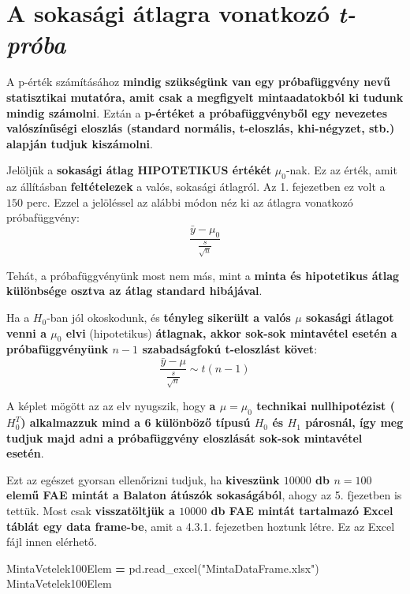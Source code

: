 \documentclass[
]{book}
\newenvironment{Shaded}{\begin{snugshade}}{\end{snugshade}}
\newcommand{\NormalTok}[1]{#1}
\newcommand{\OperatorTok}[1]{\textcolor[rgb]{0.81,0.36,0.00}{\textbf{#1}}}
\newcommand{\StringTok}[1]{\textcolor[rgb]{0.31,0.60,0.02}{#1}}
\begin{document}
\section{\texorpdfstring{A sokasági átlagra vonatkozó \emph{t-próba}}{A sokasági átlagra vonatkozó t-próba}}\label{a-sokasuxe1gi-uxe1tlagra-vonatkozuxf3-t-pruxf3ba}

A p-érték számításához \textbf{mindig szükségünk van egy próbafüggvény nevű statisztikai mutatóra, amit csak a megfigyelt mintaadatokból ki tudunk mindig számolni}. Eztán a \textbf{p-értéket a próbafüggvényből egy nevezetes valószínűségi eloszlás (standard normális, t-eloszlás, khi-négyzet, stb.) alapján tudjuk kiszámolni}.

Jelöljük a \textbf{sokasági átlag HIPOTETIKUS értékét} \(\mu_0\)-nak. Ez az érték, amit az állításban \textbf{feltételezek} a valós, sokasági átlagról. Az 1. fejezetben ez volt a \(150\) perc. Ezzel a jelöléssel az alábbi módon néz ki az átlagra vonatkozó próbafüggvény: \[\frac{\bar{y}-\mu_0}{\frac{s}{\sqrt{n}}}\]

Tehát, a próbafüggvényünk most nem más, mint a \textbf{minta és hipotetikus átlag különbsége osztva az átlag standard hibájával}.

Ha a \(H_0\)-ban jól okoskodunk, és \textbf{tényleg sikerült a valós \(\mu\) sokasági átlagot venni a \(\mu_0\) elvi} (hipotetikus) \textbf{átlagnak, akkor sok-sok mintavétel esetén a próbafüggvényünk \(n-1\) szabadságfokú t-eloszlást követ}: \[\frac{\bar{y}-\mu}{\frac{s}{\sqrt{n}}} \sim t(n-1)\]

A képlet mögött az az elv nyugszik, hogy \textbf{a \(\mu = \mu_0\) technikai nullhipotézist (\(H_0^T\)) alkalmazzuk mind a 6 különböző típusú \(H_0\) és \(H_1\) párosnál, így meg tudjuk majd adni a próbafüggvény eloszlását sok-sok mintavétel esetén}.

Ezt az egészet gyorsan ellenőrizni tudjuk, ha \textbf{kiveszünk \(10000\) db \(n=100\) elemű FAE mintát a Balaton átúszók sokaságából}, ahogy az 5. fjezetben is tettük.
Most csak \textbf{visszatöltjük a \(10000\) db FAE mintát tartalmazó Excel táblát egy data frame-be}, amit a 4.3.1. fejezetben hoztunk létre. Ez az Excel fájl innen elérhető.

\begin{Shaded}
\begin{Highlighting}[]
\NormalTok{MintaVetelek100Elem }\OperatorTok{=}\NormalTok{ pd.read\_excel(}\StringTok{"MintaDataFrame.xlsx"}\NormalTok{)}
\NormalTok{MintaVetelek100Elem}
\end{Highlighting}
\end{Shaded}
\end{document}

